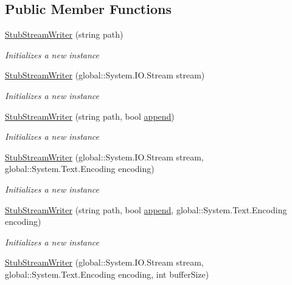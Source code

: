 \subsection*{Public Member Functions}
\begin{DoxyCompactItemize}
\item 
\hyperlink{class_system_1_1_i_o_1_1_fakes_1_1_stub_stream_writer_a17819b307398262a720c46447db50f67}{Stub\-Stream\-Writer} (string path)
\begin{DoxyCompactList}\small\item\em Initializes a new instance\end{DoxyCompactList}\item 
\hyperlink{class_system_1_1_i_o_1_1_fakes_1_1_stub_stream_writer_a6c016cbb374f7852fe9b6eb47d19731d}{Stub\-Stream\-Writer} (global\-::\-System.\-I\-O.\-Stream stream)
\begin{DoxyCompactList}\small\item\em Initializes a new instance\end{DoxyCompactList}\item 
\hyperlink{class_system_1_1_i_o_1_1_fakes_1_1_stub_stream_writer_a2080a87236380c3385b4a04e267e16c1}{Stub\-Stream\-Writer} (string path, bool \hyperlink{jquery-1_810_82-vsdoc_8js_a6b9ad5e0cf5c7480e9a327c771349a90}{append})
\begin{DoxyCompactList}\small\item\em Initializes a new instance\end{DoxyCompactList}\item 
\hyperlink{class_system_1_1_i_o_1_1_fakes_1_1_stub_stream_writer_aac108e8636fb66d38a70c906ee394052}{Stub\-Stream\-Writer} (global\-::\-System.\-I\-O.\-Stream stream, global\-::\-System.\-Text.\-Encoding encoding)
\begin{DoxyCompactList}\small\item\em Initializes a new instance\end{DoxyCompactList}\item 
\hyperlink{class_system_1_1_i_o_1_1_fakes_1_1_stub_stream_writer_a775c8fb8cf48d1a9b90dc7daac81d316}{Stub\-Stream\-Writer} (string path, bool \hyperlink{jquery-1_810_82-vsdoc_8js_a6b9ad5e0cf5c7480e9a327c771349a90}{append}, global\-::\-System.\-Text.\-Encoding encoding)
\begin{DoxyCompactList}\small\item\em Initializes a new instance\end{DoxyCompactList}\item 
\hyperlink{class_system_1_1_i_o_1_1_fakes_1_1_stub_stream_writer_ac32824ec3339df873007b0686da9e4e5}{Stub\-Stream\-Writer} (global\-::\-System.\-I\-O.\-Stream stream, global\-::\-System.\-Text.\-Encoding encoding, int buffer\-Size)

\end{DoxyCompactItemize}
